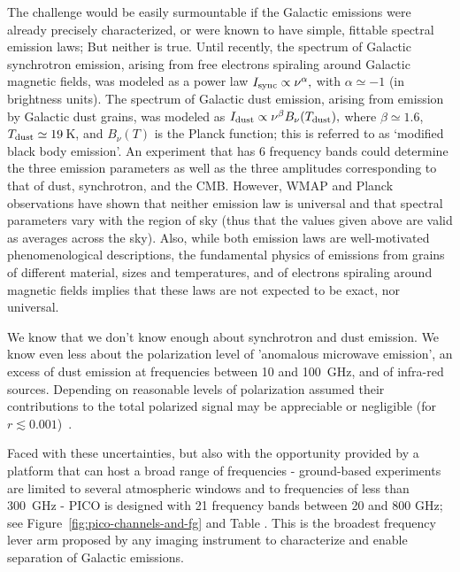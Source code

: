 \documentclass[PICOReport.tex]{subfiles}
\begin{document}
The challenge would be easily surmountable if the Galactic emissions were already precisely characterized, or were  known to have simple, fittable spectral emission laws; But neither is true. Until recently, the spectrum of Galactic synchrotron emission, arising from free electrons spiraling around Galactic magnetic fields, was modeled as a power law $I_{\rm sync} \propto \nu^{\alpha},$ with $\alpha \simeq -1$ (in brightness units). The spectrum of Galactic dust emission, arising from emission by Galactic dust grains, was modeled as $I_{\rm dust} \propto \nu^{\beta} B_\nu(T_{\rm dust}),$ where $\beta \simeq 1.6$, $T_{\rm dust} \simeq 19$\,K, and $B_\nu(T)$ is the Planck function; this is referred to as `modified black body emission'.  An experiment that has 6 frequency bands could determine the three emission parameters as well as the three amplitudes corresponding to that of dust, synchrotron, and the CMB. However, WMAP and Planck observations have shown that neither emission law is universal and that spectral parameters vary with the region of sky  (thus that the values given above are valid as averages across the sky). Also, while both emission laws are well-motivated phenomenological descriptions, the fundamental physics of emissions from grains of different material, sizes and temperatures, and of electrons spiraling around magnetic fields implies that these laws are not expected to be exact, nor universal. 

We know that we don't know enough about synchrotron and dust emission. We know even less about the polarization level of 'anomalous microwave emission', an excess of dust emission at frequencies between 10 and 100~GHz, and of infra-red sources. Depending on reasonable levels of polarization assumed their contributions to the total polarized signal may be appreciable or negligible (for $r\lesssim 0.001$)~\citep{??}.  

Faced with these uncertainties, but also with the opportunity provided by a platform that can host a broad range of frequencies - ground-based experiments are limited to several atmospheric windows and to frequencies of less than 300~GHz - PICO is designed with 21 frequency bands between 20 and 800 GHz; see Figure~\ref{fig:pico-channels-and-fg} and Table . This is the broadest frequency lever arm proposed by any imaging instrument to characterize and enable separation of Galactic emissions. 
\end{document}
